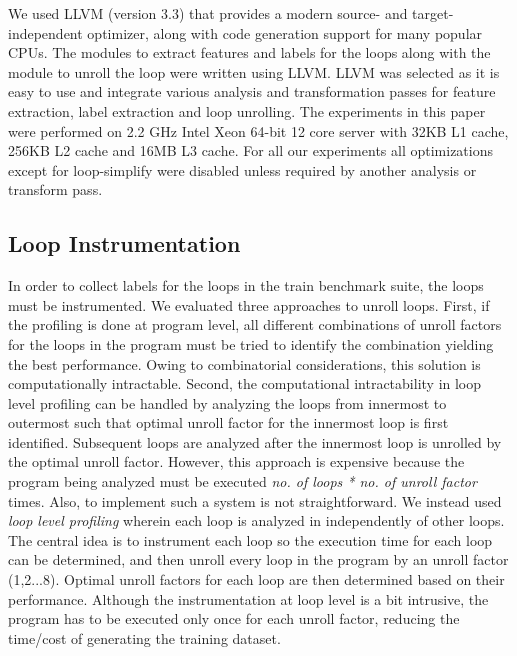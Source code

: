 \documentclass[]{sig-alternate}
\begin{document}
We used LLVM (version 3.3) that provides a modern source- and target-independent optimizer, along with code generation support for many popular CPUs. The modules to extract features and labels for the loops along with the module to unroll the loop were written using LLVM. LLVM was selected as it is easy to use and integrate various analysis and transformation passes for feature extraction, label extraction and loop unrolling.  The experiments in this paper were performed on 2.2 GHz Intel Xeon 64-bit 12 core server with 32KB L1 cache, 256KB L2 cache and 16MB L3 cache. For all our experiments all optimizations except for loop-simplify were disabled unless required by another analysis or transform pass. 

\subsection{Loop Instrumentation}
\label{subsec:LoopInstrumentation}

In order to collect labels for the loops in the train benchmark suite, the loops must be instrumented. We evaluated three approaches to unroll loops. First, if the profiling is done at program level, all different combinations of unroll factors for the loops in the program must be tried to identify the combination yielding the best performance. Owing to combinatorial considerations, this solution is computationally intractable. Second, the computational intractability in loop level profiling can be handled by analyzing the loops from innermost to outermost such that optimal unroll factor for the innermost loop is first identified. Subsequent loops are analyzed after the innermost loop is unrolled by the optimal unroll factor. However, this approach is expensive because the program being analyzed must be executed \emph{no. of loops * no. of unroll factor} times. Also, to implement such a system is not straightforward. We instead used \emph{loop level profiling} wherein each loop is analyzed in independently of other loops. The central idea is to instrument each loop so the execution time for each loop can be determined, and then unroll every loop in the program by an unroll factor (1,2...8). Optimal unroll factors for each loop are then determined based on their performance. Although the instrumentation at loop level is a bit intrusive, the program has to be executed only once for each unroll factor, reducing the time/cost of generating the training dataset.
\end{document}
